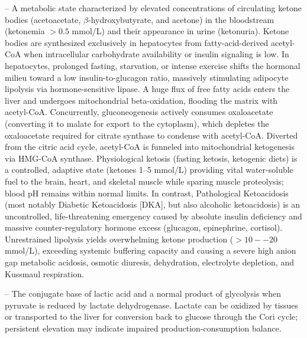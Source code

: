 -- A metabolic state characterized by elevated concentrations of circulating ketone bodies (acetoacetate, $\beta$-hydroxybutyrate, and acetone) in the bloodstream (ketonemia $>0.5$ mmol/L) and their appearance in urine (ketonuria). Ketone bodies are synthesized exclusively in hepatocytes from fatty-acid-derived acetyl-CoA when intracellular carbohydrate availability or insulin signaling is low. In hepatocytes, prolonged fasting, starvation, or intense exercise shifts the hormonal milieu toward a low insulin-to-glucagon ratio, massively stimulating adipocyte lipolysis via hormone-sensitive lipase. A huge flux of free fatty acids enters the liver and undergoes mitochondrial beta-oxidation, flooding the matrix with acetyl-CoA. Concurrently, gluconeogenesis actively consumes oxaloacetate (converting it to malate for export to the cytoplasm), which depletes the oxaloacetate required for citrate synthase to condense with acetyl-CoA. Diverted from the citric acid cycle, acetyl-CoA is funneled into mitochondrial ketogenesis via HMG-CoA synthase. Physiological ketosis (fasting ketosis, ketogenic diets) is a controlled, adaptive state (ketones 1--5 mmol/L) providing vital water-soluble fuel to the brain, heart, and skeletal muscle while sparing muscle proteolysis; blood pH remains within normal limits. In contrast, Pathological Ketoacidosis (most notably Diabetic Ketoacidosis [DKA], but also alcoholic ketoacidosis) is an uncontrolled, life-threatening emergency caused by absolute insulin deficiency and massive counter-regulatory hormone excess (glucagon, epinephrine, cortisol). Unrestrained lipolysis yields overwhelming ketone production ($>10--20$ mmol/L), exceeding systemic buffering capacity and causing a severe high anion gap metabolic acidosis, osmotic diuresis, dehydration, electrolyte depletion, and Kussmaul respiration.

-- The conjugate base of lactic acid and a normal product of glycolysis when pyruvate is reduced by lactate dehydrogenase. Lactate can be oxidized by tissues or transported to the liver for conversion back to glucose through the Cori cycle; persistent elevation may indicate impaired production-consumption balance.

